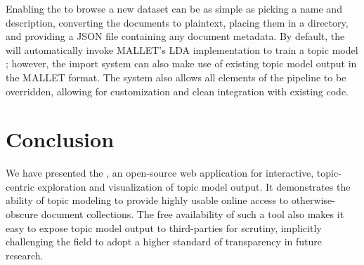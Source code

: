 \documentclass[11pt]{article}
\begin{document}
Enabling the \tool{} to browse a new dataset can be as simple as picking a name
and description, converting the documents to plaintext, placing them in a
directory, and providing a JSON file containing any document metadata. By default,
the \tool{} will automatically invoke MALLET's LDA implementation to train a
topic model \cite{McCallum2002}; however, the import system can also make use of
existing topic model output in the MALLET format. The system also allows all
elements of the pipeline to be overridden, allowing for customization and
clean integration with existing code.

\section{Conclusion}
We have presented the \tool, an open-source web application for interactive,
topic-centric exploration and visualization of topic model output.
It demonstrates the ability of topic modeling to provide
highly usable online access to otherwise-obscure document collections.
The free availability of such a tool also makes it easy to expose
topic model output to third-parties for scrutiny, implicitly challenging
the field to adopt a higher standard of transparency in future research.



\end{document}
